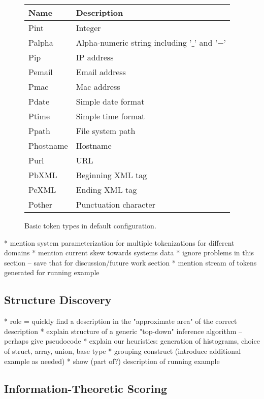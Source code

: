 \begin{figure}
\begin{center}
\begin{tabular}{|l|l|}
\hline
Name   &  Description               \\ \hline\hline
Pint  &   Integer \\ 
Palpha & Alpha-numeric string including '$\_$' and '$-$' \\
Pip & IP address \\
Pemail & Email address \\
Pmac & Mac address \\
Pdate & Simple date format \\
Ptime & Simple time format \\
Ppath & File system path \\
Phostname & Hostname \\
Purl  & URL \\
PbXML & Beginning XML tag \\
PeXML & Ending XML tag \\
Pother & Punctuation character \\\hline
\end{tabular}

\caption{Basic token types in default configuration.}
\label{figure:base-types}
\end{center}
\end{figure}
 



    *  mention system parameterization for multiple tokenizations for different domains
    * mention current skew towards systems data
    * ignore problems in this section -- save that for discussion/future work section
    * mention stream of tokens generated for running example 

\subsection {Structure Discovery}

    *  role = quickly find a description in the "approximate area" of the correct description
    * explain structure of a generic "top-down" inference algorithm -- perhaps give pseudocode
    * explain our heuristics: generation of histograms, choice of struct, array, union, base type
    * grouping construct (introduce additional example as needed)
    * show (part of?) description of running example 

\subsection {Information-Theoretic Scoring}

